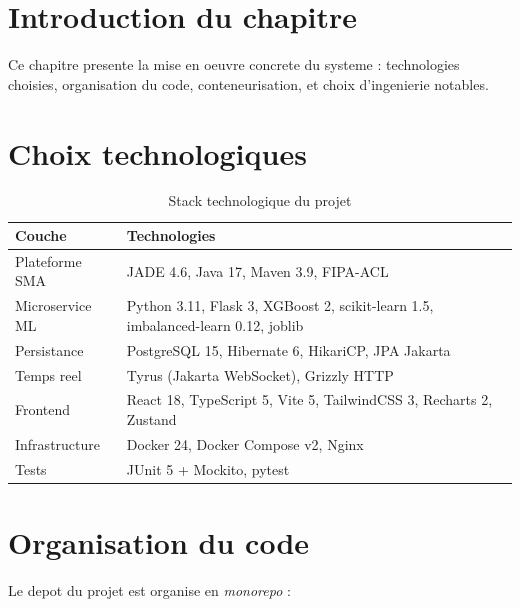\documentclass[12pt,a4paper,oneside]{report}
\begin{document}
\section{Introduction du chapitre}
Ce chapitre presente la mise en oeuvre concrete du systeme : technologies
choisies, organisation du code, conteneurisation, et choix d'ingenierie
notables.

\section{Choix technologiques}

\begin{table}[H]
\centering
\caption{Stack technologique du projet}
\label{tab:stack}
\renewcommand{\arraystretch}{1.3}
\begin{tabularx}{\textwidth}{l X}
\toprule
\textbf{Couche} & \textbf{Technologies} \\
\midrule
Plateforme SMA      & JADE 4.6, Java 17, Maven 3.9, FIPA-ACL \\
Microservice ML     & Python 3.11, Flask 3, XGBoost 2, scikit-learn 1.5, imbalanced-learn 0.12, joblib \\
Persistance         & PostgreSQL 15, Hibernate 6, HikariCP, JPA Jakarta \\
Temps reel          & Tyrus (Jakarta WebSocket), Grizzly HTTP \\
Frontend            & React 18, TypeScript 5, Vite 5, TailwindCSS 3, Recharts 2, Zustand \\
Infrastructure      & Docker 24, Docker Compose v2, Nginx \\
Tests               & JUnit 5 + Mockito, pytest \\
\bottomrule
\end{tabularx}
\end{table}

\section{Organisation du code}

Le depot du projet est organise en \emph{monorepo} :
\end{document}

